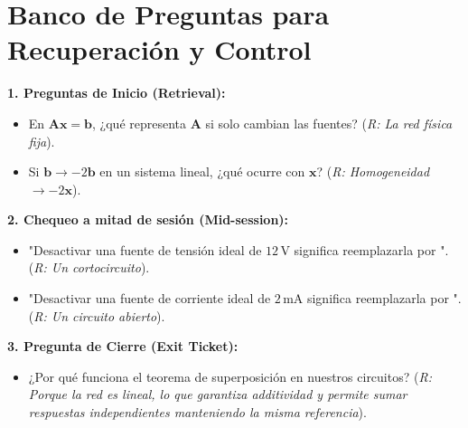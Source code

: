 \documentclass[11pt, a4paper]{article}
\begin{document}
\section*{Banco de Preguntas para Recuperación y Control}
\begin{tcolorbox}[colback=white, colframe=black, boxrule=0.5pt, arc=1mm]
\textbf{1. Preguntas de Inicio (Retrieval):}
\begin{itemize}
    \item En $\bm{A}\bm{x} = \bm{b}$, ¿qué representa $\bm{A}$ si solo cambian las fuentes? (\textit{R: La red física fija}).
    \item Si $\bm{b} \rightarrow -2\bm{b}$ en un sistema lineal, ¿qué ocurre con $\bm{x}$? (\textit{R: Homogeneidad $\rightarrow -2\bm{x}$}).
\end{itemize}

\vspace{0.2cm}
\textbf{2. Chequeo a mitad de sesión (Mid-session):}
\begin{itemize}
    \item "Desactivar una fuente de tensión ideal de $12\,\text{V}$ significa reemplazarla por \underline{\hspace{3cm}}". (\textit{R: Un cortocircuito}).
    \item "Desactivar una fuente de corriente ideal de $2\,\text{mA}$ significa reemplazarla por \underline{\hspace{3cm}}". (\textit{R: Un circuito abierto}).
\end{itemize}

\vspace{0.2cm}
\textbf{3. Pregunta de Cierre (Exit Ticket):}
\begin{itemize}
    \item ¿Por qué funciona el teorema de superposición en nuestros circuitos? (\textit{R: Porque la red es lineal, lo que garantiza additividad y permite sumar respuestas independientes manteniendo la misma referencia}).
\end{itemize}
\end{tcolorbox}
\end{document}

